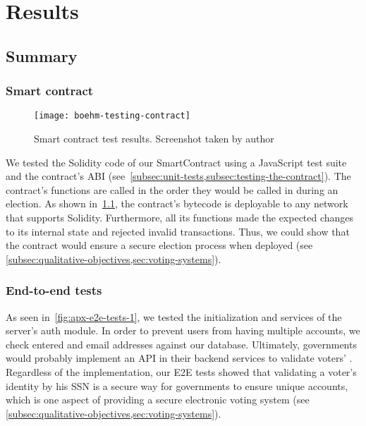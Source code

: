 \chapter{Results}\label{ch:results-evaluation-conclusion}

\section{Summary}\label{sec:results}

\subsection{Smart contract}\label{subsec:res-smart-contract}

\begin{figure}[H]
    \centering
    \texttt{[image: boehm-testing-contract]}
    \caption[Smart contract test results]{Smart contract test results. Screenshot taken by author}
    \label{fig:smart-contract-test-results}
\end{figure}

We tested the Solidity code of our \gls{SmartContract} using a JavaScript test suite and the contract's \gls{ABI} (see~\cref{subsec:unit-tests,subsec:testing-the-contract}).
The contract's functions are called in the order they would be called in during an election.
As shown in~\cref{fig:smart-contract-test-results}, the contract's bytecode is deployable to any network that supports Solidity.
Furthermore, all its functions made the expected changes to its internal state and rejected invalid transactions.
Thus, we could show that the contract would ensure a secure election process when deployed (see \cref{subsec:qualitative-objectives,sec:voting-systems}).

\subsection{End-to-end tests}\label{subsec:res-end-to-end-tests}

As seen in~\cref{fig:apx-e2e-tests-1}, we tested the initialization and services of the server's auth module.
In order to prevent users from having multiple accounts, we check entered  and email addresses against our database.
Ultimately, governments would probably implement an \gls{API} in their backend services to validate voters' .
Regardless of the implementation, our \gls{E2E} tests showed that validating a voter's identity by his \gls{SSN} is a secure way for governments to ensure unique accounts, which is one aspect of providing a secure electronic voting system (see \cref{subsec:qualitative-objectives,sec:voting-systems}).


